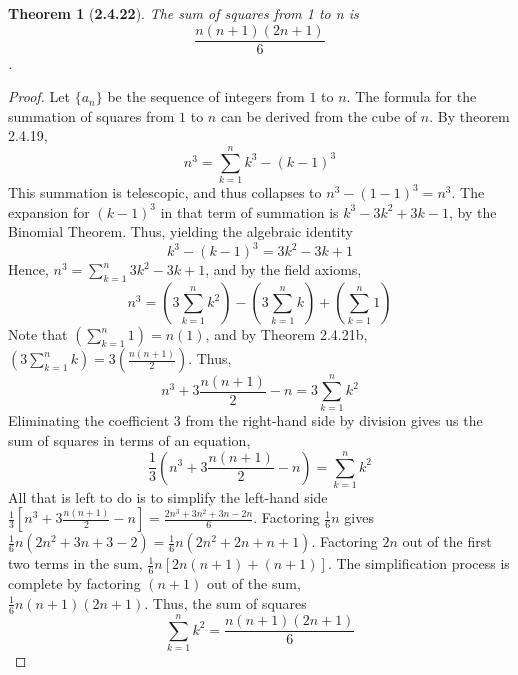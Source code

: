 \documentclass[a4paper, 12pt]{article}
\theoremstyle{plain}
\newtheorem*{theorem*}{Theorem}
\begin{document}
	
\begin{theorem*}[\textbf{2.4.22}]
    The sum of squares from 1 to n is $$\frac{n(n+1)(2n+1)}{6}$$.
\end{theorem*}

\begin{proof}
    Let $\{a_n\}$ be the sequence of integers from $1$ to $n$. The formula for the 
    summation of squares from $1$ to $n$ can be derived from the cube of $n$. By 
    theorem 2.4.19, $$n^3 = \sum_{k=1}^{n} k^3 - (k-1)^3$$ This summation is 
    telescopic, and thus collapses to $n^3 - (1 - 1)^3 = n^3$. The expansion for 
    $(k-1)^3$ in that term of summation is $k^{3} - 3k^{2} + 3k - 1$, by the Binomial 
    Theorem. Thus, yielding the algebraic identity 
    $$k^{3} - (k - 1)^{3} = 3k^{2} - 3k + 1$$ Hence, 
    $n^{3} = \sum_{k=1}^{n} 3k^{2} - 3k + 1$, and by the field axioms,
    $$n^{3} = \left(3\sum_{k=1}^{n} k^{2}\right) - \left(3\sum_{k=1}^{n} k\right) + \left(\sum_{k=1}^{n} 1\right)$$
    Note that $(\sum_{k=1}^n 1) = n(1)$, and by Theorem 2.4.21b, 
    $(3\sum_{k=1}^{n} k) = 3(\frac{n(n+1)}{2})$. Thus, 
    $$n^{3} + 3\frac{n(n+1)}{2} - n = 3\sum_{k=1}^{n} k^{2}$$
    Eliminating the coefficient 
    $3$ from the right-hand side by division gives us the sum of squares in terms of an 
    equation, $$\frac{1}{3}\left(n^{3} + 3\frac{n(n+1)}{2} - n\right) = \sum_{k=1}^{n} k^{2}$$ 
    All that is left to do is to simplify the left-hand side 
    $\frac{1}{3}[n^{3} + 3\frac{n(n+1)}{2} - n] = \frac{2n^{3} + 3n^{2} + 3n - 2n}{6}$. 
    Factoring $\frac{1}{6}n$ gives 
    $\frac{1}{6}n(2n^{2} + 3n + 3 - 2) = \frac{1}{6}n(2n^{2} + 2n + n + 1)$. Factoring $2n$
    out of the first two terms in the sum, $\frac{1}{6}n[2n(n + 1) + (n + 1)]$. The 
    simplification process is complete by factoring $(n+1)$ out of the sum, \\ 
    $\frac{1}{6}n(n+1)(2n+1)$. Thus, the sum of squares $$\sum_{k=1}^{n} k^{2} = 
    \frac{n(n+1)(2n+1)}{6}$$
\end{proof}
\end{document}
